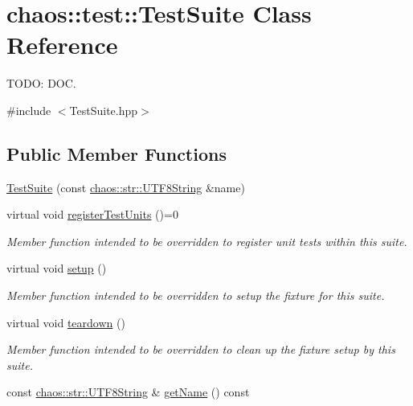 \hypertarget{classchaos_1_1test_1_1_test_suite}{\section{chaos\-:\-:test\-:\-:Test\-Suite Class Reference}
\label{classchaos_1_1test_1_1_test_suite}
}


T\-O\-D\-O\-: D\-O\-C.  




{\ttfamily \#include $<$Test\-Suite.\-hpp$>$}

\subsection*{Public Member Functions}
\begin{DoxyCompactItemize}
\item 
\hyperlink{classchaos_1_1test_1_1_test_suite_afcbbc804b722ef991edcff4841cc454e}{Test\-Suite} (const \hyperlink{classchaos_1_1str_1_1_u_t_f8_string}{chaos\-::str\-::\-U\-T\-F8\-String} \&name)
\item 
virtual void \hyperlink{classchaos_1_1test_1_1_test_suite_a3d9c8c7f0ff3f7b1f74717abc747b3fd}{register\-Test\-Units} ()=0
\begin{DoxyCompactList}\small\item\em Member function intended to be overridden to register unit tests within this suite. \end{DoxyCompactList}\item 
virtual void \hyperlink{classchaos_1_1test_1_1_test_suite_aa4ed3bfe0389ad6d4647348bfe3f2281}{setup} ()
\begin{DoxyCompactList}\small\item\em Member function intended to be overridden to setup the fixture for this suite. \end{DoxyCompactList}\item 
virtual void \hyperlink{classchaos_1_1test_1_1_test_suite_a4de0c29b1fc12621cb078104372c8f61}{teardown} ()
\begin{DoxyCompactList}\small\item\em Member function intended to be overridden to clean up the fixture setup by this suite. \end{DoxyCompactList}\item 
const \hyperlink{classchaos_1_1str_1_1_u_t_f8_string}{chaos\-::str\-::\-U\-T\-F8\-String} \& \hyperlink{classchaos_1_1test_1_1_test_suite_abc4093d7f0a7fbd47bd97fd45bd4c13e}{get\-Name} () const 
\end{DoxyCompactItemize}
